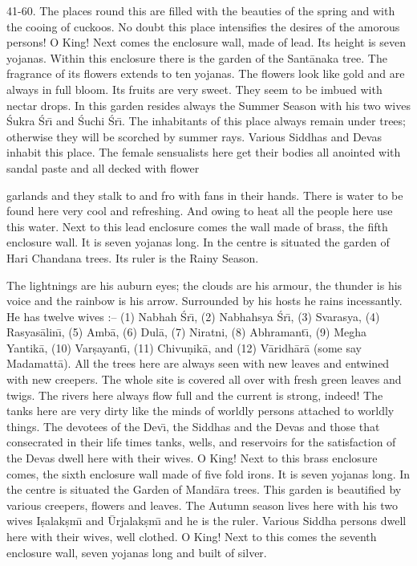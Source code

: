 41-60. The places round this are filled with the beauties of the spring and with the cooing of cuckoos. No doubt this place intensifies the desires of the amorous persons! O King! Next comes the enclosure wall, made of lead. Its height is seven yojanas. Within this enclosure there is the garden of the Sant\=anaka tree. The fragrance of its flowers extends to ten yojanas. The flowers look like gold and are always in full bloom. Its fruits are very sweet. They seem to be imbued with nectar drops. In this garden resides always the Summer Season with his two wives \'Sukra \'Sr\={\i} and \'Suchi \'Sr\={\i}. The inhabitants of this place always remain under trees; otherwise they will be scorched by summer rays. Various Siddhas and Devas inhabit this place. The female sensualists here get their bodies all anointed with sandal paste and all decked with flower

garlands and they stalk to and fro with fans in their hands. There is water to be found here very cool and refreshing. And owing to heat all the people here use this water. Next to this lead enclosure comes the wall made of brass, the fifth enclosure wall. It is seven yojanas long. In the centre is situated the garden of Hari Chandana trees. Its ruler is the Rainy Season.

The lightnings are his auburn eyes; the clouds are his armour, the thunder is his voice and the rainbow is his arrow. Surrounded by his hosts he rains incessantly. He has twelve wives :-- (1) Nabhah \'Sr\={\i}, (2) Nabhahsya \'Sr\={\i}, (3) Svarasya, (4) Rasyas\=alin\={\i}, (5) Amb\=a, (6) Dul\=a, (7) Niratni, (8) Abhramant\={\i}, (9) Megha Yantik\=a, (10) Var\d{s}ayant\={\i}, (11) Chivu\d{n}ik\=a, and (12) V\=aridh\=ar\=a (some say Madamatt\=a). All the trees here are always seen with new leaves and entwined with new creepers. The whole site is covered all over with fresh green leaves and twigs. The rivers here always flow full and the current is strong, indeed! The tanks here are very dirty like the minds of worldly persons attached to worldly things. The devotees of the Dev\={\i}, the Siddhas and the Devas and those that consecrated in their life times tanks, wells, and reservoirs for the satisfaction of the Devas dwell here with their wives. O King! Next to this brass enclosure comes, the sixth enclosure wall made of five fold irons. It is seven yojanas long. In the centre is situated the Garden of Mand\=ara trees. This garden is beautified by various creepers, flowers and leaves. The Autumn season lives here with his two wives I\d{s}alak\d{s}m\={\i} and \=Urjalak\d{s}m\={\i} and he is the ruler. Various Siddha persons dwell here with their wives, well clothed. O King! Next to this comes the seventh enclosure wall, seven yojanas long and built of silver.

